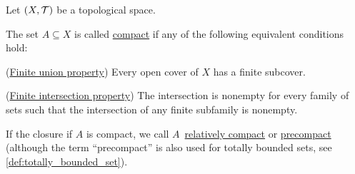 Let $(X, \mathcal T)$ be a topological space.

\begin{definition}\label{def:compact_set}\cite[40]{Deimling1985}
  The set $A \subseteq X$ is called \uline{compact} if any of the following equivalent conditions hold:
  \begin{defenum}
    \item\label{def:compact_set/union} (\uline{Finite union property}) Every open cover of $X$ has a finite subcover.
    \item\label{def:compact_set/intersection} (\uline{Finite intersection property}) The intersection is nonempty for every family of sets such that the intersection of any finite subfamily is nonempty.
  \end{defenum}

  If the closure if $A$ is compact, we call $A$~\uline{relatively compact} or \uline{precompact} (although the term \enquote{precompact} is also used for totally bounded sets, see \ref{def:totally_bounded_set}).
\end{definition}
